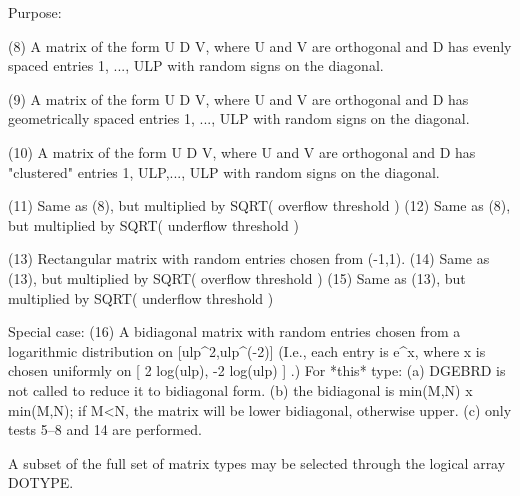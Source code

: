 \begin{DoxyParagraph}{Purpose\+: }
\begin{DoxyVerb}
 (8)  A matrix of the form  U D V, where U and V are orthogonal and
      D has evenly spaced entries 1, ..., ULP with random signs
      on the diagonal.

 (9)  A matrix of the form  U D V, where U and V are orthogonal and
      D has geometrically spaced entries 1, ..., ULP with random
      signs on the diagonal.

 (10) A matrix of the form  U D V, where U and V are orthogonal and
      D has "clustered" entries 1, ULP,..., ULP with random
      signs on the diagonal.

 (11) Same as (8), but multiplied by SQRT( overflow threshold )
 (12) Same as (8), but multiplied by SQRT( underflow threshold )

 (13) Rectangular matrix with random entries chosen from (-1,1).
 (14) Same as (13), but multiplied by SQRT( overflow threshold )
 (15) Same as (13), but multiplied by SQRT( underflow threshold )

 Special case:
 (16) A bidiagonal matrix with random entries chosen from a
      logarithmic distribution on [ulp^2,ulp^(-2)]  (I.e., each
      entry is  e^x, where x is chosen uniformly on
      [ 2 log(ulp), -2 log(ulp) ] .)  For *this* type:
      (a) DGEBRD is not called to reduce it to bidiagonal form.
      (b) the bidiagonal is  min(M,N) x min(M,N); if M<N, the
          matrix will be lower bidiagonal, otherwise upper.
      (c) only tests 5--8 and 14 are performed.

 A subset of the full set of matrix types may be selected through
 the logical array DOTYPE.\end{DoxyVerb}
 
\end{DoxyParagraph}

